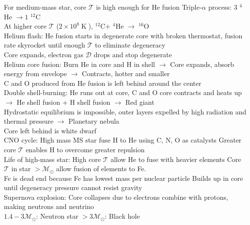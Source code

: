 \documentclass{article}
\DeclareMathOperator{\K}{K}
\begin{document}
For medium-mass star, core $\mathcal{T}$ is high enough for He fusion \quad Triple-$\alpha$ process: $3$ $^{4}$He $\rightarrow 1$ $^{12}$C\\
At higher core $\mathcal{T}$ ($2\times 10^{8}\K$), $^{12}$C$+$ $^{4}$He $\rightarrow$ $^{16}$O\\
Helium flash: He fusion starts in degenerate core with broken thermostat, fusion rate skyrocket until enough $\mathcal{T}$ to eliminate degeneracy\\
Core expands, electron gas $\mathcal{D}$ drops and stop degenerate\\
Helium core fusion: Burn He in core and H in shell $\rightarrow$ Core expands, absorb energy from envelope $\rightarrow$ Contracts, hotter and smaller\\
C and O produced from He fusion is left behind around the center\\
Double shell-burning: He runs out at core, C and O core contracts and heats up $\rightarrow$ He shell fusion + H shell fusion $\rightarrow$ Red giant\\
Hydrostatic equilibrium is impossible, outer layers expelled by high radiation and thermal pressure $\rightarrow$ Planetary nebula\\
Core left behind is white dwarf\\
CNO cycle: High mass MS star fuse H to He using C, N, O as catalysts \quad Greater core $\mathcal{T}$ enables H to overcome greater repulsion\\
Life of high-mass star: High core $\mathcal{T}$ allow He to fuse with heavier elements \quad Core $\mathcal{T}$ in star $>\mathcal{M}_{\odot}$ allow fusion of elements to Fe.\\
Fe is dead end because Fe has lowest mass per nuclear particle \quad Builds up in core until degeneracy pressure cannot resist gravity\\
Supernova explosion: Core collapses due to electrons combine with protons, making neutrons and neutrino\\
$1.4-3\mathcal{M}_{\odot}$: Neutron star \qquad $>3\mathcal{M}_{\odot}$: Black hole
\end{document}
